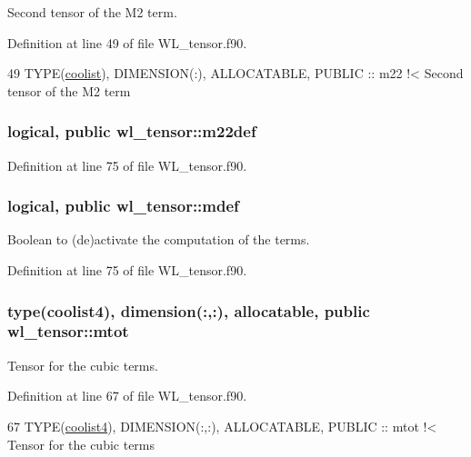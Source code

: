 Second tensor of the M2 term. 



Definition at line 49 of file W\+L\+\_\+tensor.\+f90.


\begin{DoxyCode}
49   \textcolor{keywordtype}{TYPE}(\hyperlink{structtensor_1_1coolist}{coolist}), \textcolor{keywordtype}{DIMENSION(:)}, \textcolor{keywordtype}{ALLOCATABLE}, \textcolor{keywordtype}{PUBLIC} :: m22\textcolor{comment}{   !< Second tensor of the M2 term}
\end{DoxyCode}
\subsubsection[{\texorpdfstring{m22def}{m22def}}]{\setlength{\rightskip}{0pt plus 5cm}logical, public wl\+\_\+tensor\+::m22def}\hypertarget{namespacewl__tensor_aeac41f836563c43a27362aa57da9bd69}{}\label{namespacewl__tensor_aeac41f836563c43a27362aa57da9bd69}


Definition at line 75 of file W\+L\+\_\+tensor.\+f90.

\subsubsection[{\texorpdfstring{mdef}{mdef}}]{\setlength{\rightskip}{0pt plus 5cm}logical, public wl\+\_\+tensor\+::mdef}\hypertarget{namespacewl__tensor_a3aeca3d529c65d2537167b5384a92fe0}{}\label{namespacewl__tensor_a3aeca3d529c65d2537167b5384a92fe0}


Boolean to (de)activate the computation of the terms. 



Definition at line 75 of file W\+L\+\_\+tensor.\+f90.

\subsubsection[{\texorpdfstring{mtot}{mtot}}]{\setlength{\rightskip}{0pt plus 5cm}type({\bf coolist4}), dimension(\+:,\+:), allocatable, public wl\+\_\+tensor\+::mtot}\hypertarget{namespacewl__tensor_adca9555f9f2997566b295bcc1ef1df25}{}\label{namespacewl__tensor_adca9555f9f2997566b295bcc1ef1df25}


Tensor for the cubic terms. 



Definition at line 67 of file W\+L\+\_\+tensor.\+f90.


\begin{DoxyCode}
67   \textcolor{keywordtype}{TYPE}(\hyperlink{structtensor_1_1coolist4}{coolist4}), \textcolor{keywordtype}{DIMENSION(:,:)}, \textcolor{keywordtype}{ALLOCATABLE}, \textcolor{keywordtype}{PUBLIC} :: mtot\textcolor{comment}{ !< Tensor for the cubic terms}
\end{DoxyCode}
